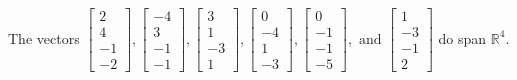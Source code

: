 \begin{exercise}
\begin{exerciseStatement}
  \end{exerciseStatement}
  \begin{exerciseAnswer}
   The vectors \(\left[\begin{array}{r}
2 \\
4 \\
-1 \\
-2
\end{array}\right] , \left[\begin{array}{r}
-4 \\
3 \\
-1 \\
-1
\end{array}\right] , \left[\begin{array}{r}
3 \\
1 \\
-3 \\
1
\end{array}\right] , \left[\begin{array}{r}
0 \\
-4 \\
1 \\
-3
\end{array}\right] , \left[\begin{array}{r}
0 \\
-1 \\
-1 \\
-5
\end{array}\right] , \text{ and } \left[\begin{array}{r}
1 \\
-3 \\
-1 \\
2
\end{array}\right]\) 
  	 do  
	span \(\mathbb{R}^4\).
  


  \end{exerciseAnswer}
\end{exercise}